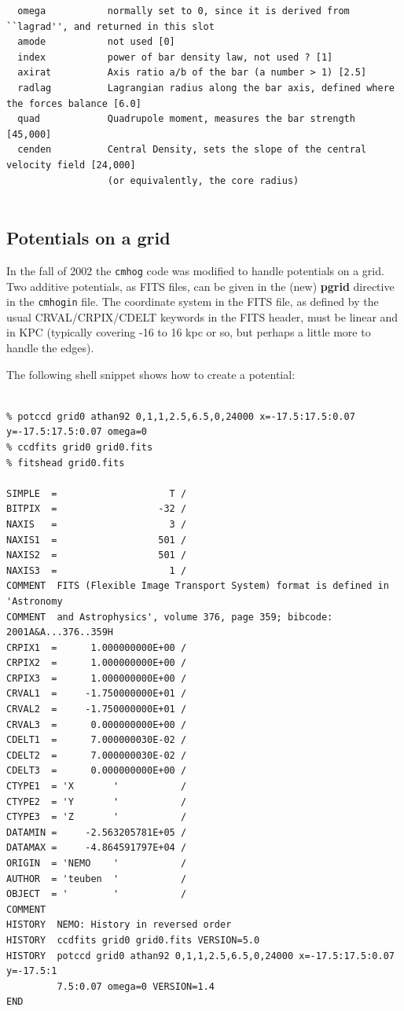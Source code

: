 \documentclass[10pt,dvips]{article}
\begin{document}
{\begin{verbatim}
  omega           normally set to 0, since it is derived from ``lagrad'', and returned in this slot
  amode           not used [0]
  index           power of bar density law, not used ? [1]
  axirat          Axis ratio a/b of the bar (a number > 1) [2.5]
  radlag          Lagrangian radius along the bar axis, defined where the forces balance [6.0]
  quad            Quadrupole moment, measures the bar strength [45,000]
  cenden          Central Density, sets the slope of the central velocity field [24,000]
                  (or equivalently, the core radius)
  
\end{verbatim}

\subsection{Potentials on a grid}

In the fall of 2002 the {\tt cmhog} code was modified to handle potentials
on a grid. Two additive potentials, as FITS files, can be given in the
(new) {\bf pgrid} directive in the {\tt cmhogin} file. The coordinate
system in the FITS file, as defined by the usual CRVAL/CRPIX/CDELT keywords
in the FITS header, must be linear and in KPC (typically covering -16 to
16 kpc or so, but perhaps a little more to handle the edges). 

The following shell snippet shows how to create a potential:


\begin{verbatim}

% potccd grid0 athan92 0,1,1,2.5,6.5,0,24000 x=-17.5:17.5:0.07 y=-17.5:17.5:0.07 omega=0
% ccdfits grid0 grid0.fits 
% fitshead grid0.fits

SIMPLE  =                    T /
BITPIX  =                  -32 /
NAXIS   =                    3 /
NAXIS1  =                  501 /
NAXIS2  =                  501 /
NAXIS3  =                    1 /
COMMENT  FITS (Flexible Image Transport System) format is defined in 'Astronomy
COMMENT  and Astrophysics', volume 376, page 359; bibcode: 2001A&A...376..359H
CRPIX1  =      1.000000000E+00 /
CRPIX2  =      1.000000000E+00 /
CRPIX3  =      1.000000000E+00 /
CRVAL1  =     -1.750000000E+01 /
CRVAL2  =     -1.750000000E+01 /
CRVAL3  =      0.000000000E+00 /
CDELT1  =      7.000000030E-02 /
CDELT2  =      7.000000030E-02 /
CDELT3  =      0.000000000E+00 /
CTYPE1  = 'X       '           /
CTYPE2  = 'Y       '           /
CTYPE3  = 'Z       '           /
DATAMIN =     -2.563205781E+05 /
DATAMAX =     -4.864591797E+04 /
ORIGIN  = 'NEMO    '           /
AUTHOR  = 'teuben  '           /
OBJECT  = '        '           /
COMMENT
HISTORY  NEMO: History in reversed order
HISTORY  ccdfits grid0 grid0.fits VERSION=5.0
HISTORY  potccd grid0 athan92 0,1,1,2.5,6.5,0,24000 x=-17.5:17.5:0.07 y=-17.5:1
         7.5:0.07 omega=0 VERSION=1.4
END



\end{verbatim}}
\end{document}
